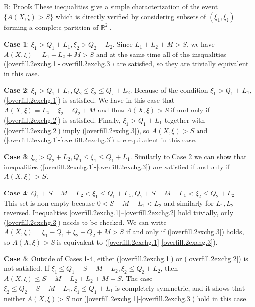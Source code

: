 \documentclass[opre,nonblindrev]{informs3}
\begin{document}
\begin{APPENDIX}{B: Proofs}
\noindent These inequalities give a simple characterization of the event $\{A(X,\xi)>S\}$ which is directly verified by considering subsets of $(\xi_1,\xi_2)$ forming a complete partition of $\mathbb{R}^2_+$.

{\bf Case 1:} $\xi_1>Q_1+L_1, \xi_2>Q_2+L_2$. Since $L_1+L_2+M>S$, we  have $A(X,\xi)=L_1+L_2+M>S$ and at the same time all of the inequalities (\ref{overfill.2exchg.1}-\ref{overfill.2exchg.3}) are satisfied, so they are trivially equivalent in this case.

{\bf Case 2:} $\xi_1>Q_1+L_1, Q_2\leq\xi_2\leq Q_2+L_2$. Because of the condition $\xi_1>Q_1+L_1$, (\ref{overfill.2exchg.1}) is satisfied. We have in this case that $A(X,\xi)=L_1+\xi_2-Q_2+M$ and thus $A(X,\xi)>S$ if and only if (\ref{overfill.2exchg.2}) is satisfied. Finally, $\xi_1>Q_1+L_1$ together with (\ref{overfill.2exchg.2}) imply (\ref{overfill.2exchg.3}), so $A(X,\xi)>S$ and (\ref{overfill.2exchg.1}-\ref{overfill.2exchg.3}) are equivalent in this case.

{\bf Case 3:} $\xi_2>Q_2+L_2, Q_1\leq\xi_1\leq Q_1+L_1$. Similarly to Case 2 we can show that inequalities (\ref{overfill.2exchg.1}-\ref{overfill.2exchg.3}) are satisfied if and only if $A(X,\xi)>S$.

{\bf Case 4:} $Q_1+S-M-L_2<\xi_1\leq Q_1+L_1, Q_2+S-M-L_1<\xi_2\leq Q_2+L_2$. This set is non-empty because $0<S - M- L_1 <L_2$ and similarly for $L_1, L_2$ reversed. Inequalities \eqref{overfill.2exchg.1}--\eqref{overfill.2exchg.2} hold trivially, only (\ref{overfill.2exchg.3}) needs to be checked. We can write $A(X,\xi)=\xi_1-Q_1+\xi_2-Q_2+M>S$ if and only if (\ref{overfill.2exchg.3}) holds, so $A(X,\xi)>S$ is equivalent to (\ref{overfill.2exchg.1}-\ref{overfill.2exchg.3}).

{\bf Case 5:} Outside of Cases 1-4, either (\ref{overfill.2exchg.1}) or (\ref{overfill.2exchg.2}) is not satisfied. If $\xi_1\leq Q_1+S-M-L_2, \xi_2\leq Q_2+L_2$, then $A(X,\xi)\leq S-M-L_2 + L_2 +M = S$. The case $\xi_2\leq Q_2+S-M-L_1, \xi_1\leq Q_1+L_1$ is completely symmetric, and it shows that neither $A(X,\xi)> S$ nor (\ref{overfill.2exchg.1}-\ref{overfill.2exchg.3}) hold in this case.


\end{APPENDIX}
\end{document}
